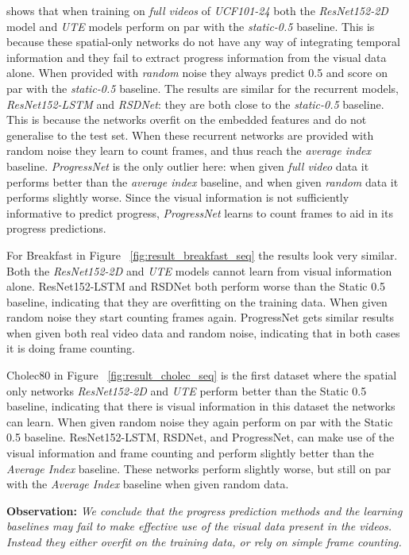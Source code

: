  shows that when training on \textsl{full videos} of \textsl{UCF101-24} both the \textsl{ResNet152-2D} model and \textsl{UTE} models perform on par with the \textsl{static-0.5} baseline.
This is because these spatial-only networks do not have any way of integrating temporal information and they fail to extract progress information from the visual data alone. 
When provided with \textsl{random} noise they always predict 0.5 and score on par with the \textsl{static-0.5} baseline. 
The results are similar for the recurrent models, \textsl{ResNet152-LSTM} and \textsl{RSDNet}: they are both close to the \textsl{static-0.5} baseline. 
This is because the networks overfit on the embedded features and do not generalise to the test set. When these recurrent networks are provided with random noise they learn to count frames, and thus reach the \textsl{average index} baseline. 
\textsl{ProgressNet} is the only outlier here: when given \textsl{full video} data it performs better than the \textsl{average index} baseline, and when given \textsl{random} data it performs slightly worse. 
Since the visual information is not sufficiently informative to predict progress, \textsl{ProgressNet} learns to count frames to aid in its progress predictions.

For Breakfast in Figure ~\ref{fig:result_breakfast_seq} the results look very similar. Both the \textsl{ResNet152-2D} and \textsl{UTE} models cannot learn from visual information alone. ResNet152-LSTM and RSDNet both perform worse than the Static 0.5 baseline, indicating that they are overfitting on the training data. When given random noise they start counting frames again. ProgressNet gets similar results when given both real video data and random noise, indicating that in both cases it is doing frame counting.

Cholec80 in Figure ~\ref{fig:result_cholec_seq} is the first dataset where the spatial only networks \textsl{ResNet152-2D} and \textsl{UTE} perform better than the Static 0.5 baseline, indicating that there is visual information in this dataset the networks can learn. When given random noise they again perform on par with the Static 0.5 baseline. ResNet152-LSTM, RSDNet, and ProgressNet, can make use of the visual information and frame counting and perform slightly better than the \textsl{Average Index} baseline. These networks perform slightly worse, but still on par with the \textsl{Average Index} baseline when given random data.

\noindent\textbf{Observation:} \emph{We conclude that the progress prediction methods and the learning baselines may fail to make effective use of the visual data present in the videos. Instead they either overfit on the training data, or rely on simple frame counting.}

